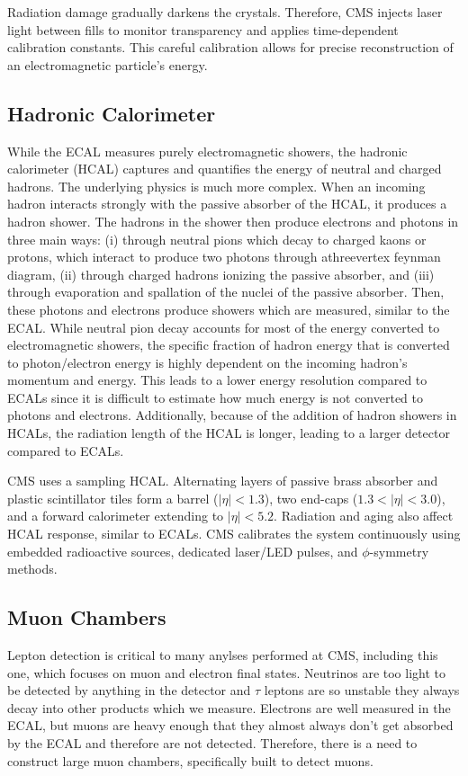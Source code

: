 Radiation damage gradually darkens the crystals. Therefore, CMS injects laser light between fills to monitor transparency and applies time-dependent calibration constants. This careful calibration allows for precise reconstruction of an electromagnetic particle's energy. 


\subsection{Hadronic Calorimeter}
While the ECAL measures purely electromagnetic showers, the hadronic calorimeter (HCAL) captures and quantifies the energy of neutral and charged hadrons.  The underlying physics is much more complex. When an incoming hadron interacts strongly with the passive absorber of the HCAL, it produces a hadron shower. The hadrons in the shower then produce electrons and photons in three main ways: (i) through neutral pions which decay to charged kaons or protons, which interact to produce two photons through athreevertex feynman diagram, (ii) through charged hadrons ionizing the passive absorber, and (iii) through evaporation and spallation of the nuclei of the passive absorber. Then, these photons and electrons produce showers which are measured, similar to the ECAL. While neutral pion decay accounts for most of the energy converted to electromagnetic showers, the specific fraction of hadron energy that is converted to photon/electron energy is highly dependent on the incoming hadron's momentum and energy. This leads to a lower energy resolution compared to ECALs since it is difficult to estimate how much energy is not converted to photons and electrons. Additionally, because of the addition of hadron showers in HCALs, the radiation length of the HCAL is longer, leading to a larger detector compared to ECALs. 


CMS uses a sampling HCAL.  Alternating layers of passive brass absorber and plastic scintillator tiles form a barrel ($|\eta|<1.3$), two end-caps ($1.3<|\eta|<3.0$), and a forward calorimeter extending to $|\eta| < 5.2$. Radiation and aging also affect HCAL response, similar to ECALs. CMS calibrates the system continuously using embedded radioactive sources, dedicated laser/LED pulses, and $\phi$-symmetry methods.

\subsection{Muon Chambers}

Lepton detection is critical to many anylses performed at CMS, including this one, which focuses on muon and electron final states. Neutrinos are too light to be detected by anything in the detector and $\tau$ leptons are so unstable they always decay into other products which we measure. Electrons are well measured in the ECAL, but muons are heavy enough that they almost always don't get absorbed by the ECAL and therefore are not detected. Therefore, there is a need to construct large muon chambers, specifically built to detect muons. 

